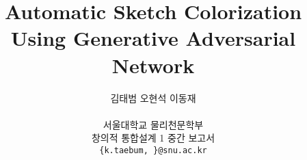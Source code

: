 \documentclass[10pt,letterpaper]{article}
\begin{document}
\title{Automatic Sketch Colorization Using Generative Adversarial Network}

\author{김태범
\qquad
오현석
\qquad
이동재\\
\\
서울대학교 물리천문학부\\
창의적 통합설계 1 중간 보고서 \\
{\tt\small \{k.taebum, \}@snu.ac.kr}
}

\maketitle
\begin{abstract}
\end{abstract}


\tableofcontents

\pagebreak

\begin{multicols}{2}












{\small


}
\end{multicols}
\end{document}
